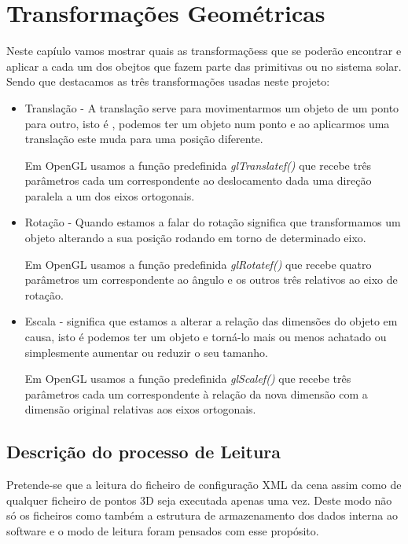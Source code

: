 \chapter{Transformações Geométricas}
Neste capíulo vamos mostrar quais as transformaçõess que se poderão encontrar e aplicar a cada um dos obejtos que fazem parte das primitivas ou no sistema solar.
Sendo que destacamos as três transformações usadas neste projeto: 
\begin{itemize}
\item{Translação} - A translação serve para movimentarmos um objeto de um ponto para outro,
isto é , podemos ter um objeto num ponto e ao aplicarmos uma translação este muda para uma posição diferente.

Em OpenGL usamos a função predefinida \textit{glTranslatef()} que recebe três parâmetros cada um correspondente ao deslocamento dada uma direção paralela a um dos eixos ortogonais. 

\item{Rotação} - Quando estamos a falar do rotação significa que transformamos um objeto alterando a sua posição rodando em torno de determinado eixo.  

Em OpenGL usamos a função predefinida \textit{glRotatef()} que recebe quatro parâmetros um correspondente  ao ângulo e os outros três relativos ao eixo de rotação. 

\item{Escala} - significa que estamos a alterar a relação das dimensões do objeto em causa, isto é  podemos ter um objeto e torná-lo mais ou menos achatado ou simplesmente aumentar ou reduzir o seu tamanho.

Em OpenGL usamos a função predefinida \textit{glScalef()} que recebe três parâmetros cada um correspondente à relação da nova dimensão com a dimensão original relativas aos eixos ortogonais. 

\end{itemize}


\section{Descrição do processo de Leitura }

	Pretende-se que a leitura do ficheiro de configuração XML da cena assim como de qualquer ficheiro de pontos 3D seja executada apenas uma vez. Deste modo não só os ficheiros como também a estrutura de armazenamento dos dados interna ao software  e o modo de leitura foram pensados com esse propósito. 

